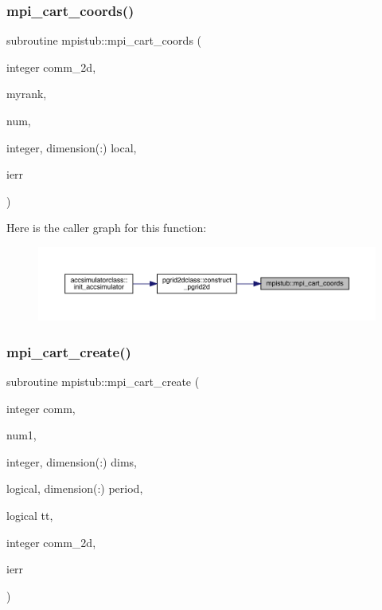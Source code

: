 \mbox{\label{namespacempistub_a599bb38fd4a9f405ced50d48c09116ca}} 
\subsubsection{\texorpdfstring{mpi\_cart\_coords()}{mpi\_cart\_coords()}}
{\footnotesize\ttfamily subroutine mpistub\+::mpi\+\_\+cart\+\_\+coords (\begin{DoxyParamCaption}\item[{integer}]{comm\+\_\+2d,  }\item[{}]{myrank,  }\item[{}]{num,  }\item[{integer, dimension(\+:)}]{local,  }\item[{}]{ierr }\end{DoxyParamCaption})}

Here is the caller graph for this function\+:\nopagebreak
\begin{figure}[H]
\begin{center}
\leavevmode
\includegraphics[width=350pt]{namespacempistub_a599bb38fd4a9f405ced50d48c09116ca_icgraph}
\end{center}
\end{figure}
\mbox{\label{namespacempistub_ae0b8402fe840a321a5e4eabbda8ecb43}} 
\subsubsection{\texorpdfstring{mpi\_cart\_create()}{mpi\_cart\_create()}}
{\footnotesize\ttfamily subroutine mpistub\+::mpi\+\_\+cart\+\_\+create (\begin{DoxyParamCaption}\item[{integer}]{comm,  }\item[{}]{num1,  }\item[{integer, dimension(\+:)}]{dims,  }\item[{logical, dimension(\+:)}]{period,  }\item[{logical}]{tt,  }\item[{integer}]{comm\+\_\+2d,  }\item[{}]{ierr }\end{DoxyParamCaption})}


